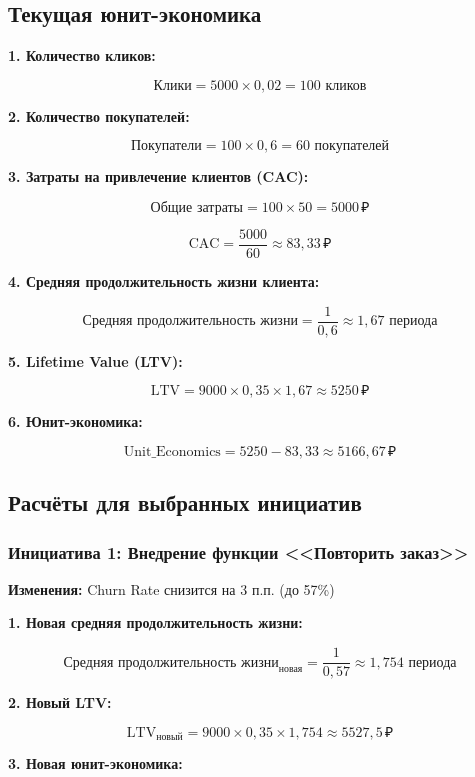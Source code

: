 \documentclass[a4paper,12pt]{article}
\begin{document}
\subsection{Текущая юнит-экономика}

\textbf{1. Количество кликов:}

\[
\text{Клики} = 5000 \times 0{,}02 = 100 \text{ кликов}
\]

\textbf{2. Количество покупателей:}

\[
\text{Покупатели} = 100 \times 0{,}6 = 60 \text{ покупателей}
\]

\textbf{3. Затраты на привлечение клиентов (CAC):}

\[
\text{Общие затраты} = 100 \times 50 = 5000 \, \text{₽}
\]

\[
\text{CAC} = \frac{5000}{60} \approx 83{,}33 \, \text{₽}
\]

\textbf{4. Средняя продолжительность жизни клиента:}

\[
\text{Средняя продолжительность жизни} = \frac{1}{0{,}6} \approx 1{,}67 \text{ периода}
\]

\textbf{5. Lifetime Value (LTV):}

\[
\text{LTV} = 9000 \times 0{,}35 \times 1{,}67 \approx 5250 \, \text{₽}
\]

\textbf{6. Юнит-экономика:}

\[
\text{Unit\_Economics} = 5250 - 83{,}33 \approx 5166{,}67 \, \text{₽}
\]

\subsection{Расчёты для выбранных инициатив}

\subsubsection{Инициатива 1: Внедрение функции <<Повторить заказ>>}

\textbf{Изменения:} Churn Rate снизится на 3 п.п. (до 57\%)

\textbf{1. Новая средняя продолжительность жизни:}

\[
\text{Средняя продолжительность жизни}_{\text{новая}} = \frac{1}{0{,}57} \approx 1{,}754 \text{ периода}
\]

\textbf{2. Новый LTV:}

\[
\text{LTV}_{\text{новый}} = 9000 \times 0{,}35 \times 1{,}754 \approx 5527{,}5 \, \text{₽}
\]

\textbf{3. Новая юнит-экономика:}
\end{document}
